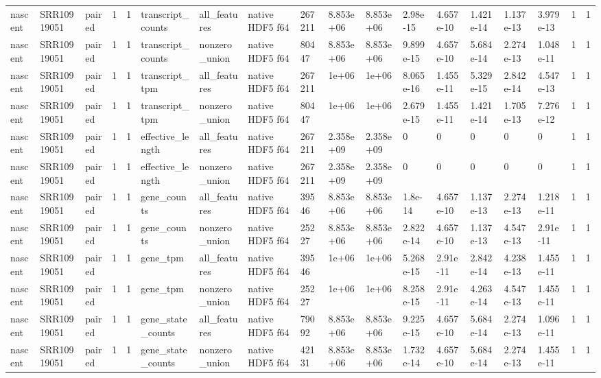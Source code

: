 \begin{tabular}{llllllllllllllllll}
nascent & SRR10919051 & paired & 1 & 1 & transcript\_counts & all\_features & native HDF5 f64 & 267211 & 8.853e+06 & 8.853e+06 & 2.98e-15 & 4.657e-10 & 1.421e-14 & 1.137e-13 & 3.979e-13 & 1 & 1 \\
nascent & SRR10919051 & paired & 1 & 1 & transcript\_counts & nonzero\_union & native HDF5 f64 & 80447 & 8.853e+06 & 8.853e+06 & 9.899e-15 & 4.657e-10 & 5.684e-14 & 2.274e-13 & 1.048e-11 & 1 & 1 \\
nascent & SRR10919051 & paired & 1 & 1 & transcript\_tpm & all\_features & native HDF5 f64 & 267211 & 1e+06 & 1e+06 & 8.065e-16 & 1.455e-11 & 5.329e-15 & 2.842e-14 & 4.547e-13 & 1 & 1 \\
nascent & SRR10919051 & paired & 1 & 1 & transcript\_tpm & nonzero\_union & native HDF5 f64 & 80447 & 1e+06 & 1e+06 & 2.679e-15 & 1.455e-11 & 1.421e-14 & 1.705e-13 & 7.276e-12 & 1 & 1 \\
nascent & SRR10919051 & paired & 1 & 1 & effective\_length & all\_features & native HDF5 f64 & 267211 & 2.358e+09 & 2.358e+09 & 0 & 0 & 0 & 0 & 0 & 1 & 1 \\
nascent & SRR10919051 & paired & 1 & 1 & effective\_length & nonzero\_union & native HDF5 f64 & 267211 & 2.358e+09 & 2.358e+09 & 0 & 0 & 0 & 0 & 0 & 1 & 1 \\
nascent & SRR10919051 & paired & 1 & 1 & gene\_counts & all\_features & native HDF5 f64 & 39546 & 8.853e+06 & 8.853e+06 & 1.8e-14 & 4.657e-10 & 1.137e-13 & 2.274e-13 & 1.218e-11 & 1 & 1 \\
nascent & SRR10919051 & paired & 1 & 1 & gene\_counts & nonzero\_union & native HDF5 f64 & 25227 & 8.853e+06 & 8.853e+06 & 2.822e-14 & 4.657e-10 & 1.137e-13 & 4.547e-13 & 2.91e-11 & 1 & 1 \\
nascent & SRR10919051 & paired & 1 & 1 & gene\_tpm & all\_features & native HDF5 f64 & 39546 & 1e+06 & 1e+06 & 5.268e-15 & 2.91e-11 & 2.842e-14 & 4.238e-13 & 1.455e-11 & 1 & 1 \\
nascent & SRR10919051 & paired & 1 & 1 & gene\_tpm & nonzero\_union & native HDF5 f64 & 25227 & 1e+06 & 1e+06 & 8.258e-15 & 2.91e-11 & 4.263e-14 & 4.547e-13 & 1.455e-11 & 1 & 1 \\
nascent & SRR10919051 & paired & 1 & 1 & gene\_state\_counts & all\_features & native HDF5 f64 & 79092 & 8.853e+06 & 8.853e+06 & 9.225e-15 & 4.657e-10 & 5.684e-14 & 2.274e-13 & 1.096e-11 & 1 & 1 \\
nascent & SRR10919051 & paired & 1 & 1 & gene\_state\_counts & nonzero\_union & native HDF5 f64 & 42131 & 8.853e+06 & 8.853e+06 & 1.732e-14 & 4.657e-10 & 5.684e-14 & 2.274e-13 & 1.455e-11 & 1 & 1 \\

\end{tabular}

